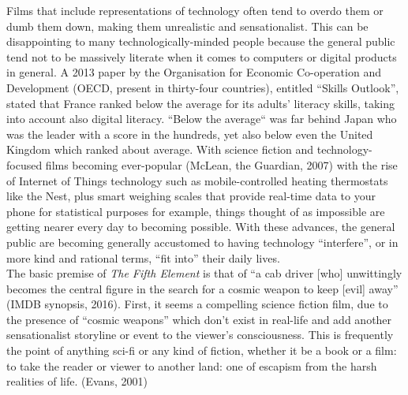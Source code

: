 \documentclass[12pt,a4paper]{article}
\begin{document}
Films that include representations of technology often tend to overdo
them or dumb them down, making them unrealistic and sensationalist.
This can be disappointing to many technologically-minded people
because the general public tend not to be massively literate when it
comes to computers or digital products in general. A 2013 paper by the
Organisation for Economic Co-operation and Development (OECD, present
in thirty-four countries), entitled ``Skills Outlook'', stated that
France ranked below the average for its adults' literacy skills,
taking into account also digital literacy. ``Below the average`` was
far behind Japan who was the leader with a score in the hundreds, yet
also below even the United Kingdom which ranked about average. With
science fiction and technology-focused films becoming ever-popular
(McLean, the Guardian, 2007) with the rise of Internet of Things
technology such as mobile-controlled heating thermostats like the
Nest, plus smart weighing scales that provide real-time data to your
phone for statistical purposes for example, things thought of as
impossible are getting nearer every day to becoming possible. With
these advances, the general public are becoming generally accustomed
to having technology ``interfere'', or in more kind and rational
terms, ``fit into'' their daily lives.\\

The basic premise of \textit{The Fifth Element} is that of ``a cab
driver [who] unwittingly becomes the central figure in the search for
a cosmic weapon to keep [evil] away'' (IMDB synopsis, 2016).  First,
it seems a compelling science fiction film, due to the presence of
``cosmic weapons'' which don't exist in real-life and add another
sensationalist storyline or event to the viewer's consciousness. This
is frequently the point of anything sci-fi or any kind of fiction,
whether it be a book or a film: to take the reader or viewer to
another land: one of escapism from the harsh realities of life.
(Evans, 2001)\\
\end{document}
